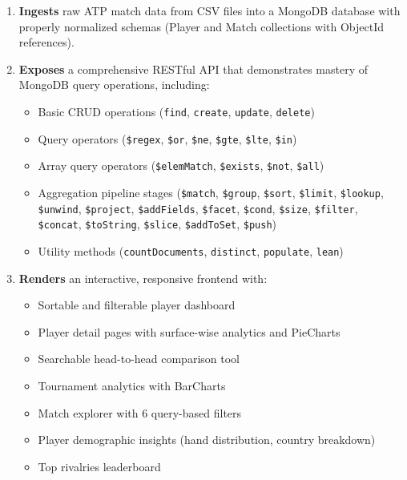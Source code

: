 \documentclass[12pt,a4paper]{article}
\begin{document}
\begin{enumerate}
    \item \textbf{Ingests} raw ATP match data from CSV files into a MongoDB database with properly normalized schemas (Player and Match collections with ObjectId references).

    \item \textbf{Exposes} a comprehensive RESTful API that demonstrates mastery of MongoDB query operations, including:
    \begin{itemize}[noitemsep]
        \item Basic CRUD operations (\texttt{find}, \texttt{create}, \texttt{update}, \texttt{delete})
        \item Query operators (\texttt{\$regex}, \texttt{\$or}, \texttt{\$ne}, \texttt{\$gte}, \texttt{\$lte}, \texttt{\$in})
        \item Array query operators (\texttt{\$elemMatch}, \texttt{\$exists}, \texttt{\$not}, \texttt{\$all})
        \item Aggregation pipeline stages (\texttt{\$match}, \texttt{\$group}, \texttt{\$sort}, \texttt{\$limit}, \texttt{\$lookup}, \texttt{\$unwind}, \texttt{\$project}, \texttt{\$addFields}, \texttt{\$facet}, \texttt{\$cond}, \texttt{\$size}, \texttt{\$filter}, \texttt{\$concat}, \texttt{\$toString}, \texttt{\$slice}, \texttt{\$addToSet}, \texttt{\$push})
        \item Utility methods (\texttt{countDocuments}, \texttt{distinct}, \texttt{populate}, \texttt{lean})
    \end{itemize}

    \item \textbf{Renders} an interactive, responsive frontend with:
    \begin{itemize}[noitemsep]
        \item Sortable and filterable player dashboard
        \item Player detail pages with surface-wise analytics and PieCharts
        \item Searchable head-to-head comparison tool
        \item Tournament analytics with BarCharts
        \item Match explorer with 6 query-based filters
        \item Player demographic insights (hand distribution, country breakdown)
        \item Top rivalries leaderboard
    \end{itemize}
\end{enumerate}
\end{document}
